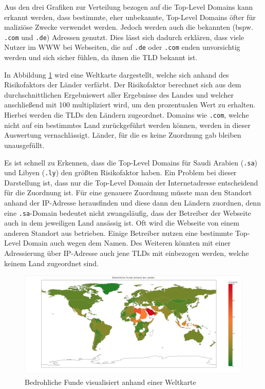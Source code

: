 Aus den drei Grafiken zur Verteilung bezogen auf die Top-Level Domains kann erkannt werden, dass bestimmte, eher unbekannte, Top-Level Domains öfter für maliziöse Zwecke verwendet werden. Jedoch werden auch die bekannten (bspw. \lstinline[style=eclipse]{.com} und \lstinline[style=eclipse]{.de}) Adressen genutzt. Dies lässt sich dadurch erklären, dass viele Nutzer im \ac{WWW} bei Webseiten, die auf \lstinline[style=eclipse]{.de} oder \lstinline[style=eclipse]{.com} enden unvorsichtig werden und sich sicher fühlen, da ihnen die \ac{TLD} bekannt ist.

In Abbildung \ref{fig:analyse-weltkarte} wird eine Weltkarte dargestellt, welche sich anhand des Risikofaktors der Länder verfärbt. Der Risikofaktor berechnet sich aus dem durchschnittlichen Ergebniswert aller Ergebnisse des Landes und welcher anschließend mit 100 multipliziert wird, um den prozentualen Wert zu erhalten. Hierbei werden die \acp{TLD} den Ländern zugeordnet. Domains wie \lstinline[style=eclipse]{.com}, welche nicht auf ein bestimmtes Land zurückgeführt werden können, werden in dieser Auswertung vernachlässigt. Länder, für die es keine Zuordnung gab bleiben unausgefüllt.

Es ist schnell zu Erkennen, dass die Top-Level Domains für Saudi Arabien (\lstinline[style=eclipse]{.sa}) und Libyen (\lstinline[style=eclipse]{.ly}) den größten Risikofaktor haben. Ein Problem bei dieser Darstellung ist, dass nur die Top-Level Domain der Internetadresse entscheidend für die Zuordnung ist. Für eine genauere Zuordnung müsste man den Standort anhand der IP-Adresse herausfinden und diese dann den Ländern zuordnen, denn eine \lstinline[style=eclipse]{.sa}-Domain bedeutet nicht zwangsläufig, dass der Betreiber der Webseite auch in dem jeweiligen Land ansässig ist. Oft wird die Webseite von einem anderen Standort aus betrieben. Einige Betreiber nutzen eine bestimmte Top-Level Domain auch wegen dem Namen. Des Weiteren könnten mit einer Adressierung über IP-Adresse auch jene \acp{TLD} mit einbezogen werden, welche keinem Land zugeordnet sind.

\begin{figure}[H]
  \centering
  \includegraphics[width=\textwidth]{images/stats/weltkarte}
  \caption[Bedrohliche Funde visualisiert anhand einer Weltkarte]{Bedrohliche Funde visualisiert anhand einer Weltkarte\protect\footnotemark}
  \label{fig:analyse-weltkarte}
\end{figure}

